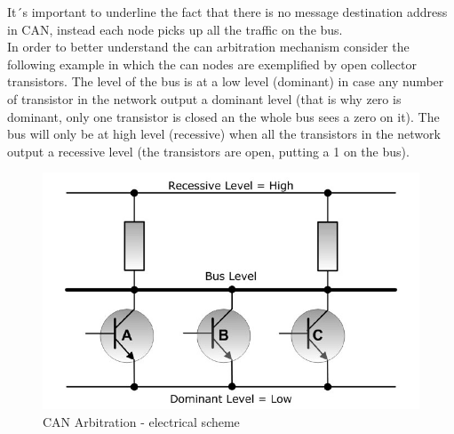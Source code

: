 \documentclass[../main.tex]{subfiles}
\begin{document}
It´s important to underline the fact that there is no message destination address in CAN, instead each node picks up all the traffic on the bus.\\
In order to better understand the can arbitration mechanism consider the following example in which the can nodes are exemplified by open collector transistors. 
The level of the bus is at a low level (dominant) in case any number of transistor in the network output a dominant level (that is why zero is dominant, only one transistor is closed an the whole bus sees a zero on it). The bus will only be at high level (recessive) when all the transistors in the network output a recessive level (the transistors are open, putting a 1 on the bus).
\begin{figure}[ht]
    \centering
    \includegraphics[width=\linewidth]{images_folder/controller-area-network-can-bus-bus-arbitration-3.jpg}
    \caption{CAN Arbitration -  electrical scheme}
    \label{fig:CANABRELT}
\end{figure}
\end{document}
